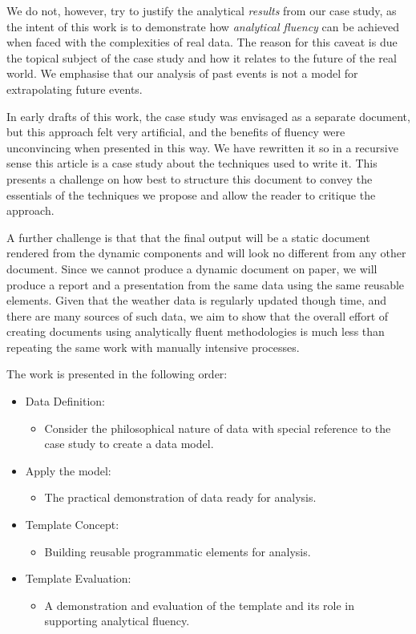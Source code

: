 \documentclass[smallextended]{svjour3}       %
\providecommand{\tightlist}{%
  \setlength{\itemsep}{0pt}\setlength{\parskip}{0pt}}
\begin{document}
We do not, however, try to justify the analytical \emph{results} from our case study, as the intent of this work is to demonstrate how \emph{analytical fluency} can be achieved when faced with the complexities of real data. The reason for this caveat is due the topical subject of the case study and how it relates to the future of the real world. We emphasise that our analysis of past events is not a model for extrapolating future events.

In early drafts of this work, the case study was envisaged as a separate document, but this approach felt very artificial, and the benefits of fluency were unconvincing when presented in this way. We have rewritten it so in a recursive sense this article is a case study about the techniques used to write it. This presents a challenge on how best to structure this document to convey the essentials of the techniques we propose and allow the reader to critique the approach.

A further challenge is that that the final output will be a static document rendered from the dynamic components and will look no different from any other document. Since we cannot produce a dynamic document on paper, we will produce a report and a presentation from the same data using the same reusable elements. Given that the weather data is regularly updated though time, and there are many sources of such data, we aim to show that the overall effort of creating documents using analytically fluent methodologies is much less than repeating the same work with manually intensive processes.

The work is presented in the following order:

\begin{itemize}
\tightlist
\item
  Data Definition:

  \begin{itemize}
  \tightlist
  \item
    Consider the philosophical nature of data with special reference to the case study to create a data model.
  \end{itemize}
\item
  Apply the model:

  \begin{itemize}
  \tightlist
  \item
    The practical demonstration of data ready for analysis.
  \end{itemize}
\item
  Template Concept:

  \begin{itemize}
  \tightlist
  \item
    Building reusable programmatic elements for analysis.
  \end{itemize}
\item
  Template Evaluation:

  \begin{itemize}
  \tightlist
  \item
    A demonstration and evaluation of the template and its role in supporting analytical fluency.
  \end{itemize}
\end{itemize}
\end{document}
